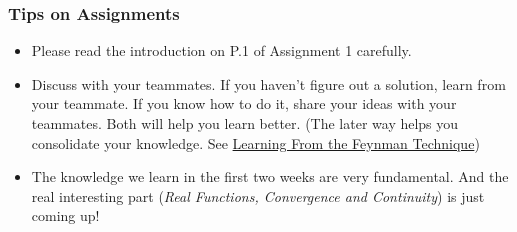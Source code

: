 \documentclass[10pt, t]{beamer}
\newcommand{\N}{\mathbb{N}}
\newcommand{\nullspace}{~\\[15pt]}
\begin{document}
    






\begin{frame}
    \frametitle{Tips on Assignments}
    \begin{itemize}
        \item Please read the introduction on P.1 of Assignment 1 carefully.
        \item Discuss with your teammates. If you haven't figure out a solution, learn from your teammate. If you know how to do it, share your ideas with your teammates. Both will help you learn better. (The later way helps you consolidate your knowledge. See \href{https://medium.com/taking-note/learning-from-the-feynman-technique-5373014ad230}{Learning From the Feynman Technique})
        \item The knowledge we learn in the first two weeks are very fundamental. And the real interesting part (\textit{Real Functions, Convergence and Continuity}) is just coming up!
    \end{itemize}
\end{frame}
\end{document}

